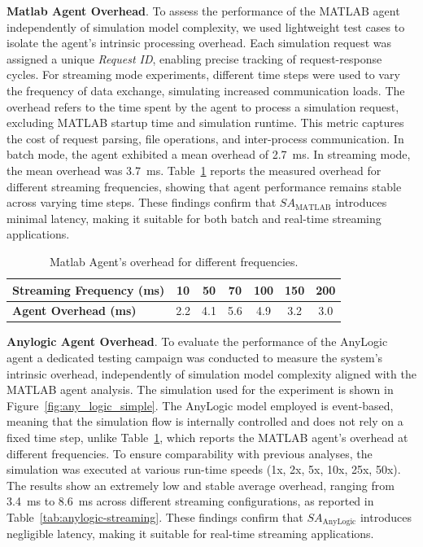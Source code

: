 \textbf{Matlab Agent Overhead}.
To assess the performance of the MATLAB agent independently of simulation model complexity, we used lightweight test cases to isolate the agent's intrinsic processing overhead. Each simulation request was assigned a unique \textit{Request ID}, enabling precise tracking of request-response cycles. For streaming mode experiments, different time steps were used to vary the frequency of data exchange, simulating increased communication loads.
The overhead refers to the time spent by the agent to process a simulation request, excluding MATLAB startup time and simulation runtime. This metric captures the cost of request parsing, file operations, and inter-process communication. In batch mode, the agent exhibited a mean overhead of 2.7~ms. In streaming mode, the mean overhead was 3.7~ms. Table~\ref{tab:matlab-streaming} reports the measured overhead for different streaming frequencies, showing that agent performance remains stable across varying time steps. These findings confirm that $SA_{\text{MATLAB}}$ introduces minimal latency, making it suitable for both batch and real-time streaming applications.

\begin{table}[h!]
\centering
\caption{Matlab Agent's overhead for different frequencies.}
\label{tab:matlab-streaming}
\begin{tabular}{lcccccc}
\hline
\textbf{Streaming Frequency (ms)} & 10 & 50 & 70 & 100 & 150 & 200 \\ 
\hline
\textbf{Agent Overhead (ms)} & 2.2 & 4.1 & 5.6 & 4.9 & 3.2 & 3.0 \\ 
\hline
\end{tabular}
\end{table}

\textbf{Anylogic Agent Overhead}. To evaluate the performance of the AnyLogic agent a dedicated testing campaign was conducted to measure the system’s intrinsic overhead, independently of simulation model complexity aligned with the MATLAB agent analysis. The simulation used for the experiment is shown in Figure~\ref{fig:any_logic_simple}. The AnyLogic model employed is event-based, meaning that the simulation flow is internally controlled and does not rely on a fixed time step, unlike Table~\ref{tab:matlab-streaming}, which reports the MATLAB agent’s overhead at different frequencies. To ensure comparability with previous analyses, the simulation was executed at various run-time speeds (1x, 2x, 5x, 10x, 25x, 50x). The results show an extremely low and stable average overhead, ranging from 3.4~ms to 8.6~ms across different streaming configurations, as reported in Table~\ref{tab:anylogic-streaming}. These findings confirm that $SA_{\text{AnyLogic}}$ introduces negligible latency, making it suitable for real-time streaming applications.

